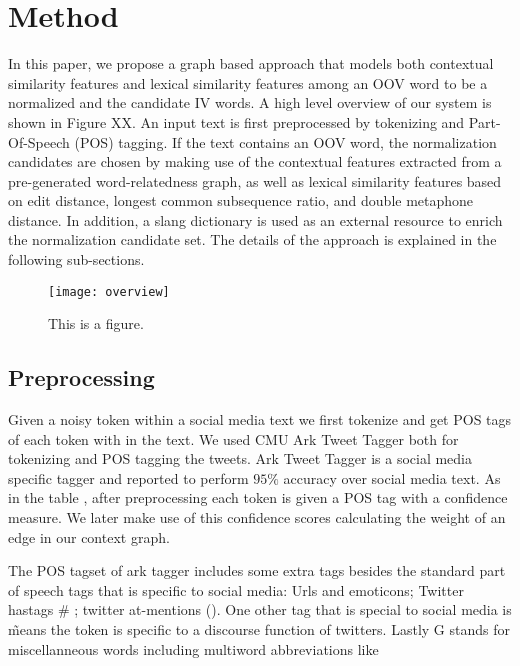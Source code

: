 \section{Method}
\label{sec:graph}



In this paper, we propose a graph based approach that models both contextual similarity features and lexical similarity features among an OOV word to be a normalized and the candidate IV words. A high level overview of our system is shown in Figure XX. An input text is first preprocessed by tokenizing and Part-Of-Speech (POS) tagging. If the text contains an OOV word, the normalization candidates are chosen by making use of the contextual features extracted from a pre-generated word-relatedness graph, as well as lexical similarity features based on edit distance, longest common subsequence ratio, and double metaphone distance. In addition, a slang dictionary is used as an external resource to enrich the normalization candidate set. The details of the approach is explained in the following sub-sections.

\begin{figure}[htb]
\begin{center}
\texttt{[image: overview]}
\caption{This is a figure.}
\end{center}
\end{figure}

\subsection{Preprocessing}

Given a noisy token within a social media text we first tokenize and get POS tags of each token with in the text. We used CMU Ark Tweet Tagger\cite{DBLP:conf/naacl/OwoputiODGSS13}\cite{Gimpel:2011:PTT:2002736.2002747} both for tokenizing and POS tagging the tweets. Ark Tweet Tagger is a social media specific tagger and reported to perform $95\%$ accuracy over social media text. As in the table \label{tab:postags}, after preprocessing each token is given a POS tag with a confidence measure. We later make use of this confidence scores calculating the weight of an edge in our context graph.

The POS tagset of ark tagger includes some extra tags besides the standard part of speech tags that is specific to social media: Urls and emoticons; Twitter hastags \# ; twitter at-mentions (\@). One other tag that is special to social media is \~ means the token is specific to a discourse function of twitters. Lastly G stands for miscellanneous words including multiword abbreviations like

